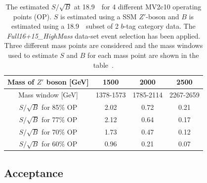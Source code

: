 \begin{table}[ht]
\begin{center}
\begin{tabular}{|c||c|c|c|}
  \hline
  Mass of $Z'$ boson [GeV]        &  1500  &   2000  &  2500  \\
  \hline
  Mass window [GeV]               & 1378-1573       &  1785-2114   &  2267-2659 \\
  \hline
  $S/\sqrt{B}$ for 85\% OP        &  2.02           &  0.72        &  0.21          \\
  $S/\sqrt{B}$ for 77\% OP        &  2.12           &  0.64        &  0.17          \\
  $S/\sqrt{B}$ for 70\% OP        &  1.73           &  0.47        &  0.12          \\
  $S/\sqrt{B}$ for 60\% OP        &  0.96           &  0.21        &  0.07          \\ \hline
\end{tabular}
\caption{The estimated $S/\sqrt{B}$ at 18.9~\ifb~for 4 different MV2c10 operating points (OP).
  $S$ is estimated using a SSM $Z'$-boson and $B$ is estimated using a 18.9~\ifb~subset of 2 $b$-tag category data.
  The \textit{Full16+15\_HighMass} data-set event selection has been applied.
  Three different mass points are considered and the mass windows used
  to estimate $S$ and $B$ for each mass point are shown in the table~\cite{dibjet-ichep_conf}.}
\label{tab:evt-btag_hm}
\end{center}
\end{table}




\subsection{Acceptance}
\label{sec:evt-sel-acc}

